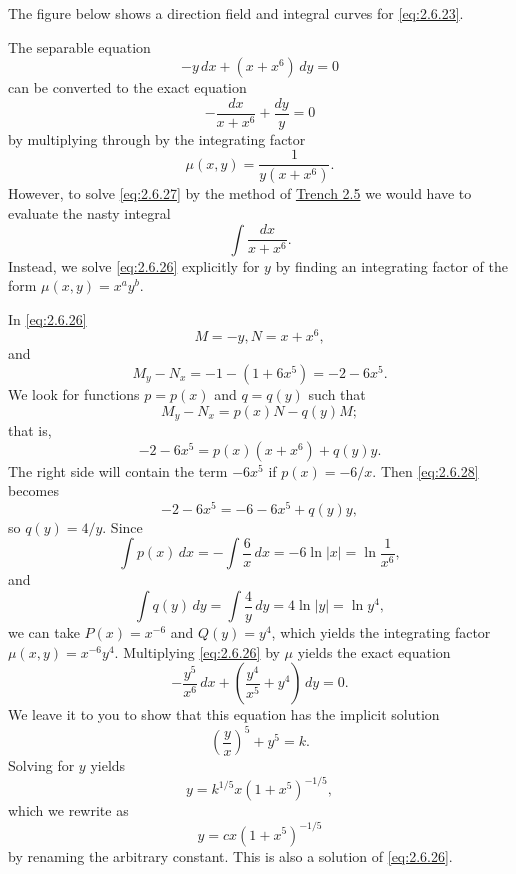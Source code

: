 \documentclass{ximera}
\begin{document}
\begin{example}
\begin{explanation}
The figure below shows a direction field and integral curves for
\eqref{eq:2.6.23}.


\begin{center}
\end{center}


\end{explanation}
\end{example}


\begin{example}\label{example:2.6.4}
The separable  equation
\begin{equation}\label{eq:2.6.26}
-y\,dx+(x+x^6)\,dy=0
\end{equation}
can be converted to the exact equation
\begin{equation} \label{eq:2.6.27}
-\frac{dx}{x+x^6}+\frac{dy}{y}=0
\end{equation}
by multiplying through
by the  integrating factor
$$
\mu(x,y)=\frac{1}{y(x+x^6)}.
$$
However, to solve \eqref{eq:2.6.27} by the method of \href{https://ximera.osu.edu/ode/main/exactEquations/exactEquations}{Trench 2.5}
we would have to evaluate the nasty integral
$$
\int \frac{dx}{x+x^6}.
$$
Instead, we solve \eqref{eq:2.6.26} explicitly for $y$ by finding  an
integrating factor of the form
$\mu(x,y)=x^ay^b$.

In \eqref{eq:2.6.26}
$$
M=-y, N=x+x^6,
$$
and
$$
M_y-N_x=-1-(1+6x^5)=-2-6x^5.
$$
We  look for functions
$p=p(x)$ and $q=q(y)$ such that
$$
M_y-N_x=p(x)N-q(y)M;
$$
that is,
\begin{equation}\label{eq:2.6.28}
-2-6x^5=p(x)(x+x^6)+q(y)y.
\end{equation}
The right side will contain the term $-6x^5$ if $p(x)=-6/x$.   Then
\eqref{eq:2.6.28} becomes
$$
-2-6x^5=-6-6x^5+q(y)y,
$$
so  $q(y)=4/y$.  Since
$$
\int p(x)\,dx=-\int\frac{6}{x}\,dx=-6\ln|x|=\ln\frac{1}{x^6},
$$
 and
$$
\int q(y)\,dy=\int\frac{4}{y}\,dy=4\ln
|y|=\ln{y^4},
$$
we can take $P(x)=x^{-6}$ and $Q(y)=y^4$,
which yields the integrating factor $\mu(x,y)=x^{-6}y^4$.
Multiplying \eqref{eq:2.6.26} by  $\mu$ yields the exact equation
$$
-\frac{y^5}{x^6}\,dx+\left(\frac{y^4}{x^5}+y^4\right)
\,dy=0.
$$
 We leave it to you to 
show that this equation has the implicit solution 
$$
\left(\frac{y}{x}\right)^5+y^5=k.
$$
 Solving for $y$ yields
$$
y=k^{1/5}x(1+x^5)^{-1/5},
$$
which we rewrite as
$$
y=cx(1+x^5)^{-1/5}
$$
by renaming the arbitrary constant.
 This is also a solution of \eqref{eq:2.6.26}.


\end{example}
\end{document}
